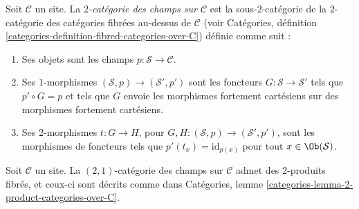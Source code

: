 \begin{definition}
\label{definition-stacks-over-C}
Soit $\mathcal{C}$ un site.
La {\it $2$-catégorie des champs sur $\mathcal{C}$}
est la sous-$2$-catégorie de la $2$-catégorie des catégories fibrées
au-dessus de $\mathcal{C}$ (voir
Catégories, définition \ref{categories-definition-fibred-categories-over-C})
définie comme suit :
\begin{enumerate}
\item Ses objets sont les champs $p : \mathcal{S} \to \mathcal{C}$.
\item Ses $1$-morphismes $(\mathcal{S}, p) \to (\mathcal{S}', p')$
sont les foncteurs $G : \mathcal{S} \to \mathcal{S}'$ tels que
$p' \circ G = p$ et tels que $G$ envoie les morphismes fortement cartésiens
sur des morphismes fortement cartésiens.
\item Ses $2$-morphismes $t : G \to H$, pour
$G, H : (\mathcal{S}, p) \to (\mathcal{S}', p')$,
sont les morphismes de foncteurs
tels que $p'(t_x) = \text{id}_{p(x)}$
pour tout $x \in \Ob(\mathcal{S})$.
\end{enumerate}
\end{definition}

\begin{lemma}
\label{lemma-2-product-stacks}
Soit $\mathcal{C}$ un site.
La $(2, 1)$-catégorie des champs sur $\mathcal{C}$
admet des 2-produits fibrés, et ceux-ci sont décrits comme dans
Catégories, lemme \ref{categories-lemma-2-product-categories-over-C}.
\end{lemma}

